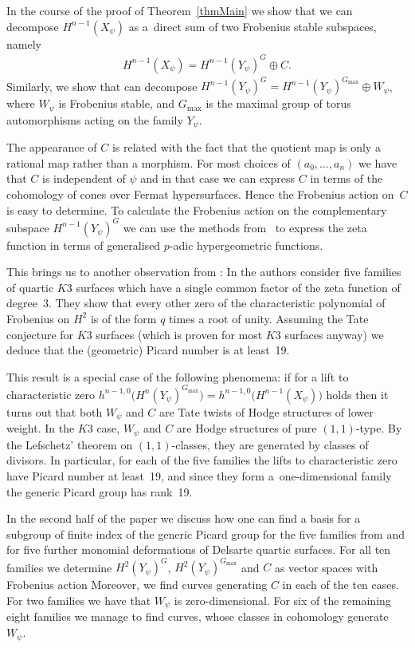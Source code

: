 \documentclass[pdftex]{sigma}
\numberwithin{equation}{section}
\begin{document}
In the course of the proof of Theorem~\ref{thmMain} we show that we can decompose $H^{n-1}(X_\psi)$ as a~direct sum of two Frobenius stable subspaces, namely
\begin{gather*} H^{n-1}(X_\psi)=H^{n-1}(Y_\psi)^G \oplus C.\end{gather*}
Similarly, we show that can decompose $H^{n-1}(Y_{\psi})^{G}= H^{n-1}(Y_{\psi})^{G_{\max}} \oplus W_\psi$, where $W_\psi$ is Frobenius stable, and $G_{\max}$ is the maximal group of torus automorphisms acting on the family $Y_\psi$.

The appearance of $C$ is related with the fact that the quotient map is only a rational map rather than a morphism. For most choices of $(a_0,\dots,a_n)$ we have that $C$ is independent of $\psi$ and in that case we can express $C$ in terms of the cohomology of cones over Fermat hypersurfaces. Hence the Frobenius action on~$C$ is easy to determine. To calculate the Frobenius action on the complementary subspace $H^{n-1}(Y_{\psi})^G$ we can use the methods from~\cite{zetafam} to express the zeta function in terms of generalised $p$-adic hypergeometric functions.

This brings us to another observation from \cite{DKSSVW}: In \cite[Section~5]{DKSSVW} the authors consider f\/ive families of quartic $K3$ surfaces which have a single common factor of the zeta function of degree~3. They show that every other zero of the characteristic polynomial of Frobenius on $H^2$ is of the form $q$ times a root of unity. Assuming the Tate conjecture for $K3$ surfaces (which is proven for most $K3$ surfaces anyway) we deduce that the (geometric) Picard number is at least~19.

This result is a special case of the following phenomena: if for a lift to characteristic zero $h^{n-1,0}\big(H^n(Y_\psi)^{G_{\max}}\big) =h^{n-1,0}\big(H^{n-1}(X_{\psi})\big)$ holds then it turns out that both $W_\psi$ and $C$ are Tate twists of Hodge structures of lower weight. In the $K3$ case, $W_\psi$ and $C$ are Hodge structures of pure $(1,1)$-type. By the Lefschetz' theorem on $(1,1)$-classes, they are generated by classes of divisors. In particular, for each of the f\/ive families the lifts to characteristic zero have Picard number at least~19, and since they form a~one-dimensional family the generic Picard group has rank~19.

In the second half of the paper we discuss how one can f\/ind a basis for a subgroup of f\/inite index of the generic Picard group for the f\/ive families from \cite{DKSSVW} and for f\/ive further monomial deformations of Delsarte quartic surfaces. For all ten families we determine $H^2(Y_\psi)^G$, $H^2(Y_\psi)^{G_{\max}}$ and $C$ as vector spaces with Frobenius action Moreover, we f\/ind curves generating $C$ in each of the ten cases. For two families we have that $W_{\psi}$ is zero-dimensional. For six of the remaining eight families we manage to f\/ind curves, whose classes in cohomology generate $W_{\psi}$.
\end{document}
